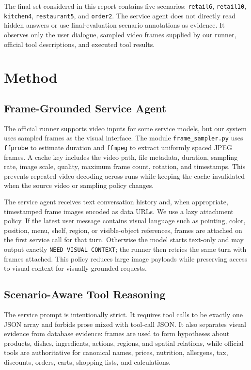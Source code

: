 \documentclass[sigconf,nonacm]{acmart}
\begin{document}
The final set considered in this report contains five scenarios: \texttt{retail6},
\texttt{retail10}, \texttt{kitchen4}, \texttt{restaurant5}, and \texttt{order2}.
The service agent does not directly read hidden answers or use final-evaluation
scenario annotations as evidence. It observes only the user dialogue, sampled
video frames supplied by our runner, official tool descriptions, and executed
tool results.

\section{Method}

\subsection{Frame-Grounded Service Agent}

The official runner supports video inputs for some service models, but our
system uses sampled frames as the visual interface. The module
\texttt{frame\_sampler.py} uses \texttt{ffprobe} to estimate duration and
\texttt{ffmpeg} to extract uniformly spaced JPEG frames. A cache key includes
the video path, file metadata, duration, sampling rate, image scale, quality,
maximum frame count, rotation, and timestamps. This prevents repeated video
decoding across runs while keeping the cache invalidated when the source video
or sampling policy changes.

The service agent receives text conversation history and, when appropriate,
timestamped frame images encoded as data URLs. We use a lazy attachment policy.
If the latest user message contains visual language such as pointing, color,
position, menu, shelf, region, or visible-object references, frames are attached
on the first service call for that turn. Otherwise the model starts text-only
and may output exactly \texttt{NEED\_VISUAL\_CONTEXT}; the runner then retries
the same turn with frames attached. This policy reduces large image payloads
while preserving access to visual context for visually grounded requests.

\subsection{Scenario-Aware Tool Reasoning}

The service prompt is intentionally strict. It requires tool calls to be exactly
one JSON array and forbids prose mixed with tool-call JSON. It also separates
visual evidence from database evidence: frames are used to form hypotheses
about products, dishes, ingredients, actions, regions, and spatial relations,
while official tools are authoritative for canonical names, prices, nutrition,
allergens, tax, discounts, orders, carts, shopping lists, and calculations.
\end{document}
